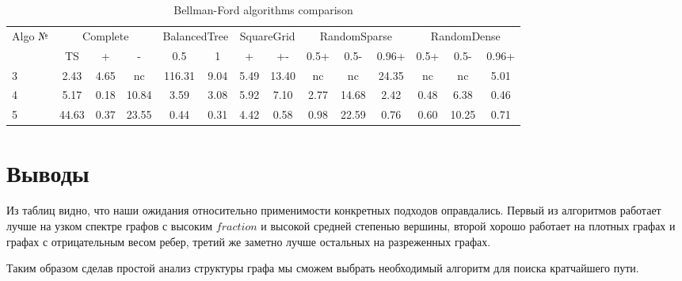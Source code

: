 \FloatBarrier
\begin{table}[H]
\centering

\begin{tabular}{l|ccc|cc|cc|ccc|ccc}  
Algo №& \multicolumn{3}{c}{Complete} & \multicolumn{2}{c}{BalancedTree} & \multicolumn{2}{c}{SquareGrid} & \multicolumn{3}{c}{RandomSparse} & \multicolumn{3}{c}{RandomDense}\\
& TS & + & - & 0.5 & 1 & + & +- & 0.5+  & 0.5- & 0.96+ & 0.5+ & 0.5- & 0.96+\\
\hline\hline
3 & 2.43 & 4.65 & nc & 116.31 & 9.04 & 5.49 & 13.40 & nc & nc & 24.35 & nc & nc & 5.01 \\  
4 & 5.17 & 0.18 & 10.84 & 3.59 & 3.08 & 5.92 & 7.10 & 2.77 & 14.68 & 2.42 & 0.48  & 6.38  & 0.46 \\
5 & 44.63 & 0.37 & 23.55 & 0.44 & 0.31 & 4.42 & 0.58 & 0.98 & 22.59 & 0.76  & 0.60  & 10.25 & 0.71 \\
\hline
\end{tabular}

\caption{Bellman-Ford algorithms comparison}
\label{graph_description}
\end{table}

\FloatBarrier
\section{Выводы}

Из таблиц видно, что наши ожидания относительно применимости конкретных подходов оправдались. Первый из алгоритмов работает лучше на узком спектре графов с высоким $fraction$ и высокой средней степенью вершины, второй хорошо работает на плотных графах и графах с отрицательным весом ребер, третий же заметно лучше остальных на разреженных графах.

Таким образом сделав простой анализ структуры графа мы сможем выбрать необходимый алгоритм для поиска кратчайшего пути. 
\FloatBarrier
